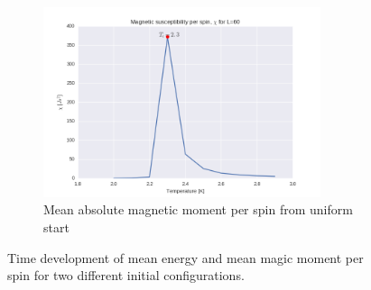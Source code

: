 \documentclass[a4paper, 10pt]{article}
\begin{document}
\begin{figure}[!ht]
    ~ 
    \begin{subfigure}[H!]{0.5\textwidth}
        \centering
        \includegraphics[height=2.2in]{chil60Ne5.png}
        \caption{Mean absolute magnetic moment per spin from uniform start}
    \end{subfigure}
      \caption{Time development of mean energy and mean magic moment per spin for two different initial configurations.}
\end{figure}
\end{document}
